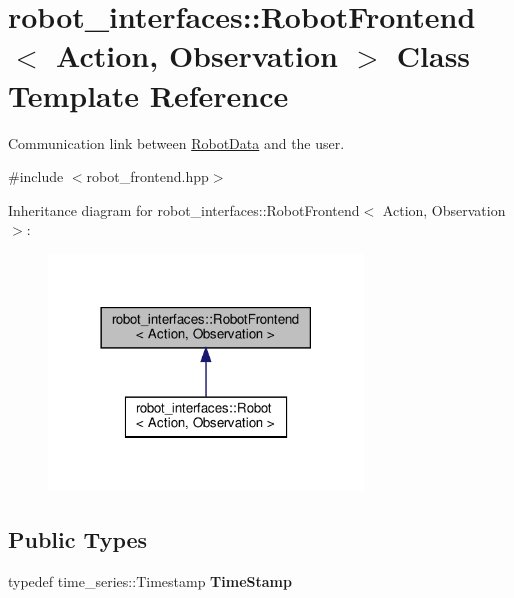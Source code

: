\hypertarget{classrobot__interfaces_1_1RobotFrontend}{}\section{robot\+\_\+interfaces\+:\+:Robot\+Frontend$<$ Action, Observation $>$ Class Template Reference}
\label{classrobot__interfaces_1_1RobotFrontend}


Communication link between \hyperlink{classrobot__interfaces_1_1RobotData}{Robot\+Data} and the user.  




{\ttfamily \#include $<$robot\+\_\+frontend.\+hpp$>$}



Inheritance diagram for robot\+\_\+interfaces\+:\+:Robot\+Frontend$<$ Action, Observation $>$\+:
\nopagebreak
\begin{figure}[H]
\begin{center}
\leavevmode
\includegraphics[width=237pt]{classrobot__interfaces_1_1RobotFrontend__inherit__graph}
\end{center}
\end{figure}
\subsection*{Public Types}
\begin{DoxyCompactItemize}
\item 
\mbox{\label{classrobot__interfaces_1_1RobotFrontend_a02bebc6c3e9822f026c48f970d80a865}} 
typedef time\+\_\+series\+::\+Timestamp {\bfseries Time\+Stamp}
\end{DoxyCompactItemize}
